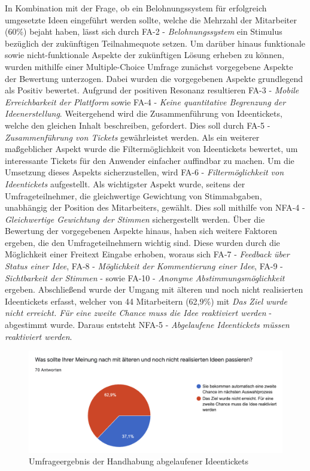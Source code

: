In Kombination mit der Frage, ob ein Belohnungssystem für erfolgreich umgesetzte Ideen eingeführt werden sollte, welche die Mehrzahl der Mitarbeiter (60\%) bejaht haben, lässt sich durch \ac{FA}-2 - \emph{Belohnungssystem} ein Stimulus bezüglich der zukünftigen Teilnahmequote setzen. Um darüber hinaus funktionale sowie nicht-funktionale Aspekte der zukünftigen Lösung erheben zu können, wurden mithilfe einer Multiple-Choice Umfrage zunächst vorgegebene Aspekte der Bewertung unterzogen. Dabei wurden die vorgegebenen Aspekte grundlegend als Positiv bewertet. Aufgrund der positiven Resonanz resultieren \ac{FA}-3 - \emph{Mobile Erreichbarkeit der Plattform} sowie \ac{FA}-4 - \emph{Keine quantitative Begrenzung der Ideenerstellung}. Weitergehend wird die Zusammenführung von Ideentickets, welche den gleichen Inhalt beschreiben, gefordert. Dies soll durch \ac{FA}-5 - \emph{Zusammenführung von Tickets} gewährleistet werden. Als ein weiterer maßgeblicher Aspekt wurde die Filtermöglichkeit von Ideentickets bewertet, um interessante Tickets für den Anwender einfacher auffindbar zu machen. Um die Umsetzung dieses Aspekts sicherzustellen, wird \ac{FA}-6 - \emph{Filtermöglichkeit von Ideentickets} aufgestellt. Als wichtigster Aspekt wurde, seitens der Umfrageteilnehmer, die gleichwertige Gewichtung von Stimmabgaben, unabhängig der Position des Mitarbeiters, gewählt. Dies soll mithilfe von \ac{NFA}-4 - \emph{Gleichwertige Gewichtung der Stimmen} sichergestellt werden. Über die Bewertung der vorgegebenen Aspekte hinaus, haben sich weitere Faktoren ergeben, die den Umfrageteilnehmern wichtig sind. Diese wurden durch die Möglichkeit einer Freitext Eingabe erhoben, woraus sich \ac{FA}-7 - \emph{Feedback über Status einer Idee}, \ac{FA}-8 - \emph{Möglichkeit der Kommentierung einer Idee}, \ac{FA}-9 - \emph{Sichtbarkeit der Stimmen} - sowie \ac{FA}-10 - \emph{Anonyme Abstimmungsmöglichkeit} ergeben. Abschließend wurde der Umgang mit älteren und noch nicht realisierten Ideentickets erfasst, welcher von 44 Mitarbeitern (62,9\%) mit \emph{Das Ziel wurde nicht erreicht. Für eine zweite Chance muss die Idee reaktiviert werden} - abgestimmt wurde. Daraus entsteht \ac{NFA}-5 - \emph{Abgelaufene Ideentickets müssen reaktiviert werden}.
\begin{figure}[hb]
	\centering
	\includegraphics[width=\textwidth]{images/Frage16}
	\caption{Umfrageergebnis der Handhabung abgelaufener Ideentickets}
	\label{fig:frage16}
\end{figure} 
\newpage
